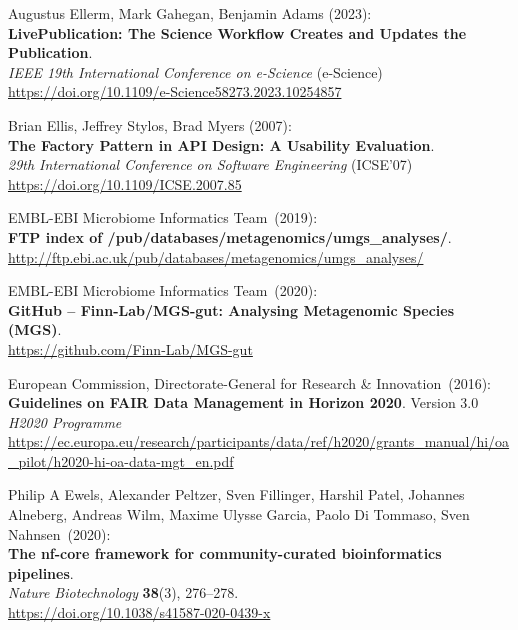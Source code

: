 \begin{thebibliography}{9}
Augustus Ellerm, Mark Gahegan, Benjamin Adams (2023):\\
\textbf{LivePublication: The Science Workflow Creates and Updates the Publication}.\\
\emph{IEEE 19th International Conference on e-Science} (e-Science) \\
\url{https://doi.org/10.1109/e-Science58273.2023.10254857}

Brian Ellis, Jeffrey Stylos, Brad Myers (2007):\\
\textbf{The Factory Pattern in API Design: A Usability Evaluation}.\\
\emph{29th International Conference on Software Engineering} (ICSE'07)\\
\url{https://doi.org/10.1109/ICSE.2007.85}

EMBL-EBI Microbiome Informatics Team~(2019): \\
\textbf{FTP index of /pub/databases/metagenomics/umgs\_analyses/}.\\
\url{http://ftp.ebi.ac.uk/pub/databases/metagenomics/umgs_analyses/}

EMBL-EBI Microbiome Informatics Team~(2020): \\
\textbf{GitHub -- Finn-Lab/MGS-gut: Analysing Metagenomic Species (MGS)}.\\
\url{https://github.com/Finn-Lab/MGS-gut}

European Commission, Directorate-General for Research \& Innovation~(2016): \\
\textbf{Guidelines on FAIR Data Management in Horizon 2020}. Version 3.0\\
\emph{H2020 Programme}\\
\url{https://ec.europa.eu/research/participants/data/ref/h2020/grants_manual/hi/oa_pilot/h2020-hi-oa-data-mgt_en.pdf}

Philip A Ewels, Alexander Peltzer, Sven Fillinger, Harshil
Patel, Johannes Alneberg, Andreas Wilm, Maxime Ulysse Garcia, Paolo Di
Tommaso, Sven Nahnsen~(2020): \\
\textbf{The nf-core framework for community-curated bioinformatics
pipelines}.\\
\emph{Nature Biotechnology} \textbf{38}(3), 276--278.\\
\url{https://doi.org/10.1038/s41587-020-0439-x}


\end{thebibliography}
